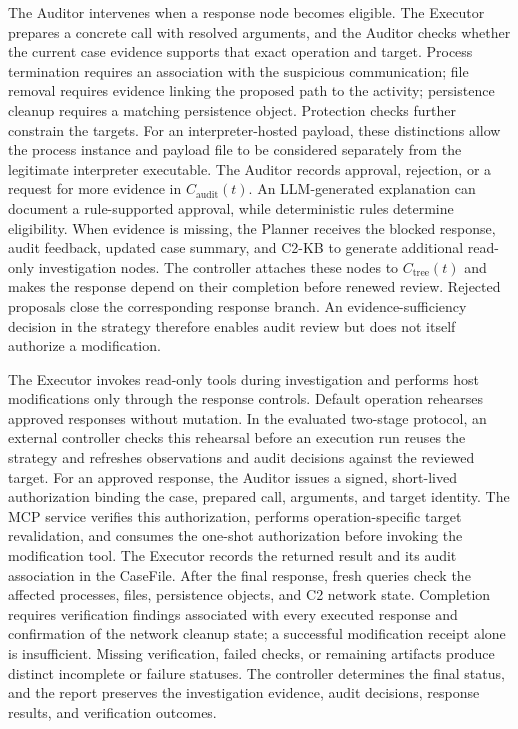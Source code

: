 \documentclass[pdflatex,sn-basic]{sn-jnl}
\begin{document}
The Auditor intervenes when a response node becomes eligible. The Executor prepares a concrete call with resolved arguments, and the Auditor checks whether the current case evidence supports that exact operation and target. Process termination requires an association with the suspicious communication; file removal requires evidence linking the proposed path to the activity; persistence cleanup requires a matching persistence object. Protection checks further constrain the targets. For an interpreter-hosted payload, these distinctions allow the process instance and payload file to be considered separately from the legitimate interpreter executable. The Auditor records approval, rejection, or a request for more evidence in $C_{\mathrm{audit}}(t)$. An LLM-generated explanation can document a rule-supported approval, while deterministic rules determine eligibility. When evidence is missing, the Planner receives the blocked response, audit feedback, updated case summary, and C2-KB to generate additional read-only investigation nodes. The controller attaches these nodes to $C_{\mathrm{tree}}(t)$ and makes the response depend on their completion before renewed review. Rejected proposals close the corresponding response branch. An evidence-sufficiency decision in the strategy therefore enables audit review but does not itself authorize a modification.

The Executor invokes read-only tools during investigation and performs host modifications only through the response controls. Default operation rehearses approved responses without mutation. In the evaluated two-stage protocol, an external controller checks this rehearsal before an execution run reuses the strategy and refreshes observations and audit decisions against the reviewed target. For an approved response, the Auditor issues a signed, short-lived authorization binding the case, prepared call, arguments, and target identity. The MCP service verifies this authorization, performs operation-specific target revalidation, and consumes the one-shot authorization before invoking the modification tool. The Executor records the returned result and its audit association in the CaseFile. After the final response, fresh queries check the affected processes, files, persistence objects, and C2 network state. Completion requires verification findings associated with every executed response and confirmation of the network cleanup state; a successful modification receipt alone is insufficient. Missing verification, failed checks, or remaining artifacts produce distinct incomplete or failure statuses. The controller determines the final status, and the report preserves the investigation evidence, audit decisions, response results, and verification outcomes.
\end{document}
